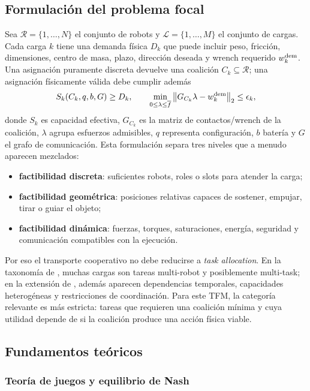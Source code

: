 \subsection{Formulación del problema focal}

Sea $\mathcal R=\{1,\dots,N\}$ el conjunto de robots y
$\mathcal L=\{1,\dots,M\}$ el conjunto de cargas. Cada carga $k$ tiene una demanda
física $D_k$ que puede incluir peso, fricción, dimensiones, centro de masa, plazo,
dirección deseada y wrench requerido $w_k^{\rm dem}$. Una asignación puramente discreta
devuelve una coalición $C_k\subseteq\mathcal R$; una asignación físicamente válida debe
cumplir además
\[
  S_k(C_k,q,b,G) \ge D_k,
  \qquad
  \min_{0\leq\lambda\leq\overline{f}}
  \left\lVert G_{C_k}\lambda-w_k^{\rm dem}\right\rVert_2 \leq \epsilon_k,
\]
donde $S_k$ es capacidad efectiva, $G_{C_k}$ es la matriz de contactos/wrench de la
coalición, $\lambda$ agrupa esfuerzos admisibles, $q$ representa configuración, $b$
batería y $G$ el grafo de comunicación. Esta formulación separa tres niveles que a menudo
aparecen mezclados:
\begin{itemize}[leftmargin=2em]
  \item \textbf{factibilidad discreta}: suficientes robots, roles o slots para atender la
  carga;
  \item \textbf{factibilidad geométrica}: posiciones relativas capaces de sostener,
  empujar, tirar o guiar el objeto;
  \item \textbf{factibilidad dinámica}: fuerzas, torques, saturaciones, energía, seguridad
  y comunicación compatibles con la ejecución.
\end{itemize}

Por eso el transporte cooperativo no debe reducirse a \emph{task allocation}. En la
taxonomía de \citet{gerkey2004formal}, muchas cargas son tareas multi-robot y
posiblemente multi-task; en la extensión de \citet{korsah2013taxonomy}, además aparecen
dependencias temporales, capacidades heterogéneas y restricciones de coordinación. Para
este TFM, la categoría relevante es más estricta: tareas que requieren una coalición
mínima y cuya utilidad depende de si la coalición produce una acción física viable.



\subsection{Fundamentos teóricos}

\subsubsection{Teoría de juegos y equilibrio de Nash}

